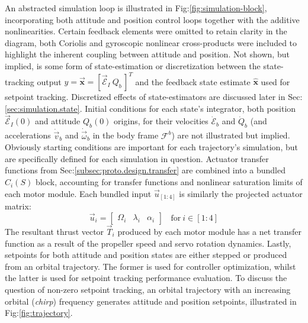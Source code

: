 \par
An abstracted simulation loop is illustrated in Fig:\ref{fig:simulation-block}, incorporating both attitude and position control loops together with the additive nonlinearities. Certain feedback elements were omitted to retain clarity in the diagram, both Coriolis and gyroscopic nonlinear cross-products were included to highlight the inherent coupling between attitude and position. Not shown, but implied, is some form of state-estimation or discretization between the state-tracking output $y=\vec{\mathbf{x}}=[\vec{\mathcal{E}}_I~Q_b\hspace{2pt}]^T$ and the feedback state estimate $\hat{\mathbf{x}}$ used for setpoint tracking. Discretized effects of state-estimators are discussed later in Sec:\ref{sec:simulation.state}. Initial conditions for each state's integrator, both position $\vec{\mathcal{E}}_I(0)$ and attitude $Q_b(0)$ origins, for their velocities $\dot{\mathcal{E}}_b$ and $\dot{Q}_b$ (and accelerations $\dot{\vec{v}}_b$ and $\dot{\vec{\omega}}_b$ in the body frame $\mathcal{F}^b$) are not illustrated but implied. Obviously starting conditions are important for each trajectory's simulation, but are specifically defined for each simulation in question. Actuator transfer functions from Sec:\ref{subsec:proto.design.transfer} are combined into a bundled $C_{i}(S)$ block, accounting for transfer functions and nonlinear saturation limits of each motor module. Each bundled input $\vec{u}_{[1:4]}$ is similarly the projected actuator matrix:
\begin{equation}
\vec{u}_i = \begin{bmatrix}
\Omega_i & \lambda_i & \alpha_i
\end{bmatrix}~~~~\text{for}~i\in[1:4]
\end{equation}
The resultant thrust vector $\vec{T}_i$ produced by each motor module has a net transfer function as a result of the propeller speed and servo rotation dynamics. Lastly, setpoints for both attitude and position states are either stepped or produced from an orbital trajectory. The former is used for controller optimization, whilst the latter is used for setpoint tracking performance evaluation. To discuss the question of non-zero setpoint tracking, an orbital trajectory with an increasing orbital (\emph{chirp}) frequency generates attitude and position setpoints, illustrated in Fig:\ref{fig:trajectory}.
